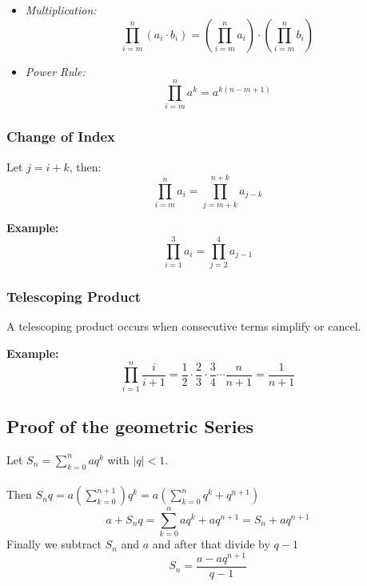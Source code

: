 \begin{itemize}[label=\(-\)]
    \item \emph{Multiplication:}
    \[
    \prod_{i = m}^{n} (a_i \cdot b_i) = \left( \prod_{i = m}^{n} a_i \right) \cdot \left( \prod_{i = m}^{n} b_i \right)
    \]
    \item \emph{Power Rule:}
    \[
    \prod_{i = m}^{n} a^k = a^{k(n - m + 1)}
    \]
\end{itemize}

\subsubsection{Change of Index}

Let \(j = i + k\), then:
\[
\prod_{i = m}^{n} a_i = \prod_{j = m + k}^{n + k} a_{j - k}
\]

\textbf{Example:}
\[
\prod_{i = 1}^{3} a_i = \prod_{j = 2}^{4} a_{j - 1}
\]

\subsubsection{Telescoping Product}

A telescoping product occurs when consecutive terms simplify or cancel.

\textbf{Example:}
\[
\prod_{i = 1}^{n} \frac{i}{i+1} = \frac{1}{2} \cdot \frac{2}{3} \cdot \frac{3}{4} \cdots \frac{n}{n+1} = \frac{1}{n+1}
\]


\subsection{Proof of the geometric Series}

Let \(S_n = \sum_{k = 0}^{n}aq^k\) with \(|q| < 1\).
\\\\
Then \(S_n q = a(\sum_{k = 0}^{n + 1})q^k = a\left( \sum_{k= 0}^{n} q^k + q^{n + 1}\right)\)
\[
a + S_nq = \sum_{k = 0}^{n}aq^k + aq^{n + 1}  = S_n + aq^{n + 1}
\]
Finally we subtract \(S_n\) and \(a\) and after that divide by \(q - 1\)
\[
S_n = \frac{a - aq^{n + 1}}{q - 1}
\]
\QED
\newpage